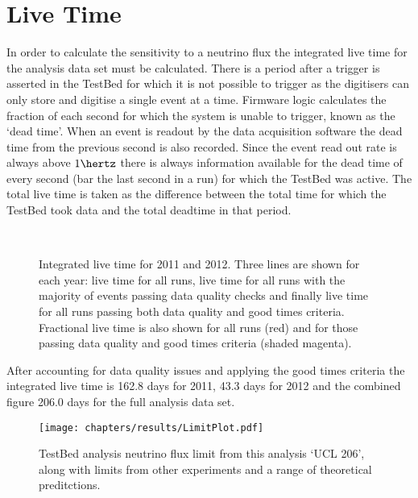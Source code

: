 \section{Live Time}
\label{sec:Live-Time}

In order to calculate the sensitivity to a neutrino flux the integrated live time for the analysis data set must be calculated. There is a period after a trigger is asserted in the TestBed for which it is not possible to trigger as the digitisers can only store and digitise a single event at a time. Firmware logic calculates the fraction of each second for which the system is unable to trigger, known as the `dead time'. When an event is readout by the data acquisition software the dead time from the previous second is also recorded. Since the event read out rate is always above $1 \hertz$ there is always information available for the dead time of every second (bar the last second in a run) for which the TestBed was active. The total live time is taken as the difference between the total time for which the TestBed took data and the total deadtime in that period.

\begin{figure}
  \hfill
  \\
  \hfill
  \caption{Integrated live time for 2011 and 2012. Three lines are shown for each year: live time for all runs, live time for all runs with the majority of events passing data quality checks and finally live time for all runs passing both data quality and good times criteria. Fractional live time is also shown for all runs (red) and for those passing data quality and good times criteria (shaded magenta).}
  \label{fig:Results:Integrated-LiveTime}
\end{figure}

After accounting for data quality issues and applying the good times criteria the integrated live time is 162.8 days for 2011, 43.3 days for 2012 and the combined figure 206.0 days for the full analysis data set.


\begin{figure}
  \texttt{[image: chapters/results/LimitPlot.pdf]}
  \caption{TestBed analysis neutrino flux limit from this analysis `UCL 206', along with limits from other experiments and a range of theoretical preditctions.}
  \label{fig:Results:Limit-Plot}
\end{figure}
